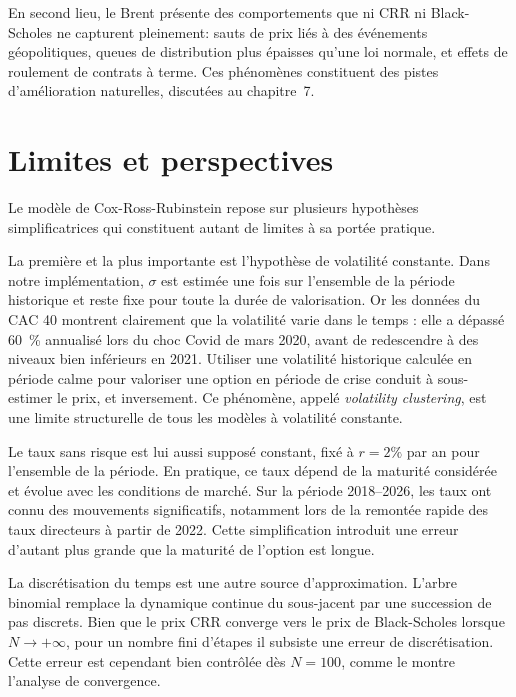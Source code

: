\documentclass[11pt]{report}
\begin{document}
En second lieu, le Brent présente des comportements que ni CRR ni
Black-Scholes ne capturent pleinement: sauts de prix liés à des
événements géopolitiques, queues de distribution plus épaisses qu'une
loi normale, et effets de roulement de contrats à terme. Ces
phénomènes constituent des pistes d'amélioration naturelles, discutées
au chapitre~7.


\chapter{Limites et perspectives}

Le modèle de Cox-Ross-Rubinstein repose sur plusieurs hypothèses simplificatrices
qui constituent autant de limites à sa portée pratique.

La première et la plus importante est l'hypothèse de volatilité constante.
Dans notre implémentation, $\sigma$ est estimée une fois sur l'ensemble de la
période historique et reste fixe pour toute la durée de valorisation. Or les
données du CAC 40 montrent clairement que la volatilité varie dans le temps :
elle a dépassé 60~\% annualisé lors du choc Covid de mars 2020, avant de
redescendre à des niveaux bien inférieurs en 2021. Utiliser une volatilité
historique calculée en période calme pour valoriser une option en période de
crise conduit à sous-estimer le prix, et inversement. Ce phénomène, appelé
\textit{volatility clustering}, est une limite structurelle de tous les modèles
à volatilité constante.

Le taux sans risque est lui aussi supposé constant, fixé à $r = 2\%$ par an
pour l'ensemble de la période. En pratique, ce taux dépend de la maturité
considérée et évolue avec les conditions de marché. Sur la période 2018--2026,
les taux ont connu des mouvements significatifs, notamment lors de la remontée
rapide des taux directeurs à partir de 2022. Cette simplification introduit
une erreur d'autant plus grande que la maturité de l'option est longue.

La discrétisation du temps est une autre source d'approximation. L'arbre
binomial remplace la dynamique continue du sous-jacent par une succession de
pas discrets. Bien que le prix CRR converge vers le prix de Black-Scholes
lorsque $N \to +\infty$, pour un nombre fini d'étapes il subsiste une erreur
de discrétisation. Cette erreur est cependant bien contrôlée dès $N = 100$,
comme le montre l'analyse de convergence.
\end{document}
